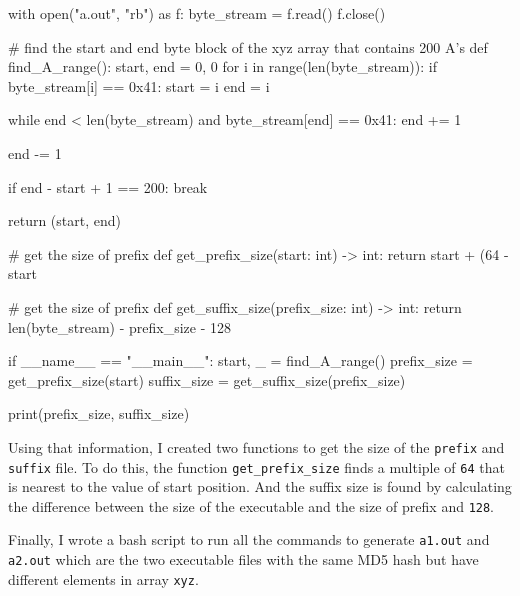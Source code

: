 \documentclass{article}
\begin{document}
\begin{python}
with open("a.out", "rb") as f:
    byte_stream = f.read()
f.close()


# find the start and end byte block of the xyz array that contains 200 A's
def find_A_range():
    start, end = 0, 0
    for i in range(len(byte_stream)):
        if byte_stream[i] == 0x41:
            start = i
            end = i

            while end < len(byte_stream) and byte_stream[end] == 0x41:
                end += 1

            end -= 1

            if end - start + 1 == 200:
                break

    return (start, end)


# get the size of prefix
def get_prefix_size(start: int) -> int:
    return start + (64 - start %


# get the size of prefix
def get_suffix_size(prefix_size: int) -> int:
    return len(byte_stream) - prefix_size - 128


if __name__ == "__main__":
    start, _ = find_A_range()
    prefix_size = get_prefix_size(start)
    suffix_size = get_suffix_size(prefix_size)

    print(prefix_size, suffix_size)
\end{python}

Using that information, I created two functions to get the size of the \texttt{prefix}
and \texttt{suffix} file. To do this, the function \texttt{get\_prefix\_size}
finds a multiple of \texttt{64} that is nearest to the value of start position.
And the suffix size is found by calculating the difference between the size of
the executable and the size of prefix and \texttt{128}.

Finally, I wrote a bash script to run all the commands to generate \texttt{a1.out}
and \texttt{a2.out} which are the two executable files with the same MD5 hash
but have different elements in array \texttt{xyz}.
\end{document}
